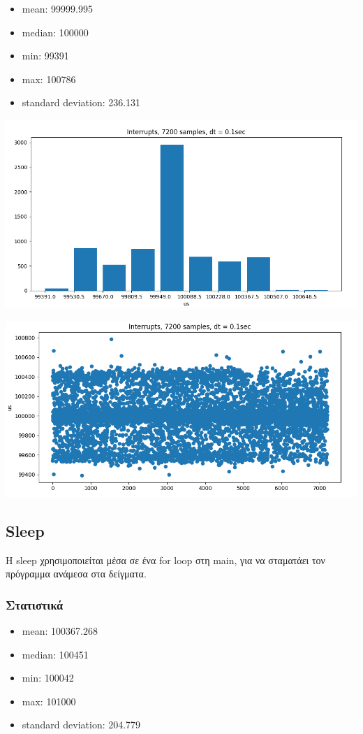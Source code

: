 \documentclass[12pt,a4paper]{article}
\begin{document}
\begin{itemize}
\item mean: 99999.995
\item median: 100000
\item min: 99391
\item max: 100786
\item standard deviation: 236.131
\end{itemize}

\includegraphics[scale=0.55]{intr_hist}

\includegraphics[scale=0.55]{intr_sctr}


\subsection{Sleep}

H sleep χρησιμοποιείται μέσα σε ένα for loop στη main, για να σταματάει τον πρόγραμμα ανάμεσα στα δείγματα.


\subsubsection*{Στατιστικά}

\begin{itemize}
\item mean: 100367.268
\item median: 100451
\item min: 100042
\item max: 101000
\item standard deviation:  204.779
\end{itemize}
\end{document}

